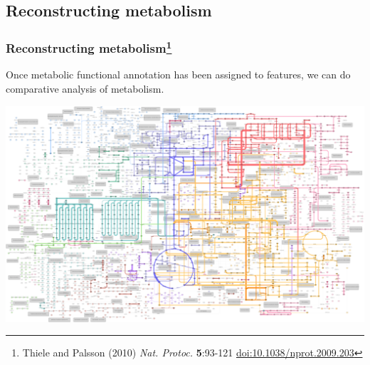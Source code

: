 
\subsection{Reconstructing metabolism}

\begin{frame}
  \frametitle{Reconstructing metabolism\footnote{\tiny{Thiele and Palsson (2010) \textit{Nat. Protoc.} \textbf{5}:93-121 \href{http://dx.doi.org/10.1038/nprot.2009.203}{doi:10.1038/nprot.2009.203}}}}
  Once metabolic functional annotation has been assigned to features, we can do comparative analysis of metabolism.
  \begin{center}
      \includegraphics[width=1\textwidth]{images/dickeya_metabolism} 
  \end{center}
\end{frame}

